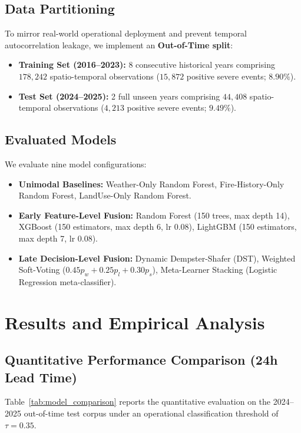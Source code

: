 \documentclass[runningheads]{llncs}
\begin{document}
\subsection{Data Partitioning}
To mirror real-world operational deployment and prevent temporal autocorrelation leakage, we implement an \textbf{Out-of-Time split}:
\begin{itemize}
    \item \textbf{Training Set (2016--2023):} 8 consecutive historical years comprising $178{,}242$ spatio-temporal observations ($15{,}872$ positive severe events; $8.90\%$).
    \item \textbf{Test Set (2024--2025):} 2 full unseen years comprising $44{,}408$ spatio-temporal observations ($4{,}213$ positive severe events; $9.49\%$).
\end{itemize}

\subsection{Evaluated Models}
We evaluate nine model configurations:
\begin{itemize}
    \item \textbf{Unimodal Baselines:} Weather-Only Random Forest, Fire-History-Only Random Forest, LandUse-Only Random Forest.
    \item \textbf{Early Feature-Level Fusion:} Random Forest (150 trees, max depth 14), XGBoost (150 estimators, max depth 6, lr 0.08), LightGBM (150 estimators, max depth 7, lr 0.08).
    \item \textbf{Late Decision-Level Fusion:} Dynamic Dempster-Shafer (DST), Weighted Soft-Voting ($0.45 p_w + 0.25 p_l + 0.30 p_s$), Meta-Learner Stacking (Logistic Regression meta-classifier).
\end{itemize}

\section{Results and Empirical Analysis}
\label{sec:results}

\subsection{Quantitative Performance Comparison (24h Lead Time)}
Table~\ref{tab:model_comparison} reports the quantitative evaluation on the 2024--2025 out-of-time test corpus under an operational classification threshold of $\tau = 0.35$.
\end{document}

